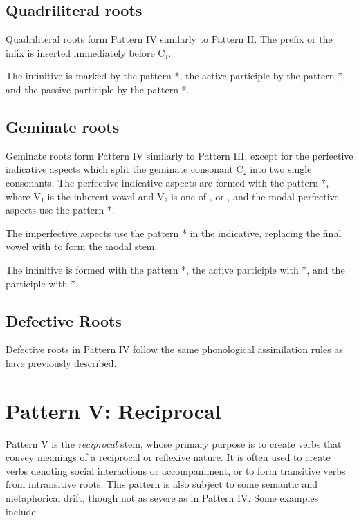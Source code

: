 \documentclass[grammar]{subfiles}
\begin{document}
\subsection{Quadriliteral roots}
\label{ssec:vm_iv_quadriliteral_roots}

Quadriliteral roots form Pattern IV similarly to Pattern II. The prefix
 or the infix  is inserted immediately before C₁. 

The infinitive is marked by the pattern *, the active
participle by the pattern *, and the passive participle by the
pattern *.  


\subsection{Geminate roots}
\label{ssec:vm_iv_geminate_roots}

Geminate roots form Pattern IV similarly to Pattern III, except for the
perfective indicative aspects which split the geminate consonant C₂ into two
single consonants.   The perfective indicative aspects are formed with the
pattern *, where V₁ is the inherent vowel and V₂ is one of
,  or , and the modal perfective aspects use the pattern
*.  

The imperfective aspects use the pattern * in the indicative,
replacing the final vowel with  to form the modal stem. 

The infinitive is formed with the pattern *, the active participle
with *, and the participle with *.  



\subsection{Defective Roots}
\label{ssec:vm_iv_defective_roots}

Defective roots in Pattern IV follow the same phonological assimilation rules
as have previously described. 


\section{Pattern V: Reciprocal}
\label{sec:vm_pattern_v}

Pattern V is the \emph{reciprocal} stem, whose primary purpose is to create verbs that
convey meanings of a reciprocal or reflexive nature.  It is often used to
create verbs denoting social interactions or accompaniment, or to form
transitive verbs from intransitive roots.  This pattern is also subject to some
semantic and metaphorical drift, though not as severe as in Pattern IV. Some examples include:
\end{document}
